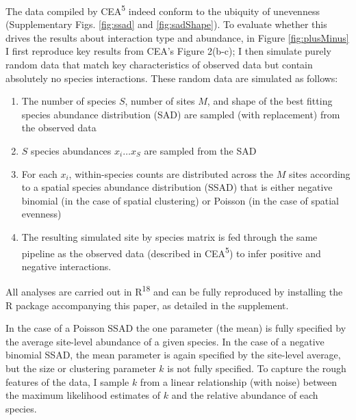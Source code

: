 \documentclass[]{article}
\providecommand{\tightlist}{%
  \setlength{\itemsep}{0pt}\setlength{\parskip}{0pt}}
\begin{document}
The data compiled by CEA\textsuperscript{5} indeed conform to the
ubiquity of unevenness (Supplementary Figs. \ref{fig:ssad} and
\ref{fig:sadShape}). To evaluate whether this drives the results about
interaction type and abundance, in Figure \ref{fig:plusMinus} I first
reproduce key results from CEA's Figure 2(b-c); I then simulate purely
random data that match key characteristics of observed data but contain
absolutely no species interactions. These random data are simulated as
follows:

\begin{enumerate}
\def\labelenumi{\arabic{enumi})}
\tightlist
\item
  The number of species \(S\), number of sites \(M\), and shape of the
  best fitting species abundance distribution (SAD) are sampled (with
  replacement) from the observed data
\item
  \(S\) species abundances \(x_i \ldots x_S\) are sampled from the SAD
\item
  For each \(x_i\), within-species counts are distributed across the
  \(M\) sites according to a spatial species abundance distribution
  (SSAD) that is either negative binomial (in the case of spatial
  clustering) or Poisson (in the case of spatial evenness)
\item
  The resulting simulated site by species matrix is fed through the same
  pipeline as the observed data (described in CEA\textsuperscript{5}) to
  infer positive and negative interactions.
\end{enumerate}

All analyses are carried out in R\textsuperscript{18} and can be fully
reproduced by installing the R package accompanying this paper, as
detailed in the supplement.

In the case of a Poisson SSAD the one parameter (the mean) is fully
specified by the average site-level abundance of a given species. In the
case of a negative binomial SSAD, the mean parameter is again specified
by the site-level average, but the size or clustering parameter \(k\) is
not fully specified. To capture the rough features of the data, I sample
\(k\) from a linear relationship (with noise) between the maximum
likelihood estimates of \(k\) and the relative abundance of each
species.
\end{document}
